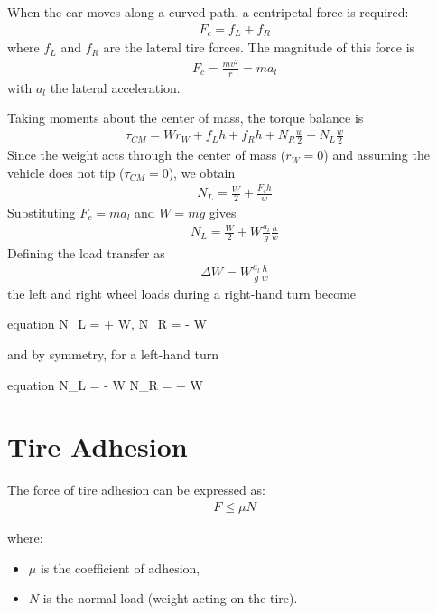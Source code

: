 \documentclass{article}
\begin{document}
	When the car moves along a curved path, a centripetal force is required:
	\begin{align}
		F_c=f_L+f_R
		\label{eq:centrifugal}
	\end{align}
	where $f_L$ and $f_R$ are the lateral tire forces. The magnitude of this force is
	\begin{align}
		F_c = \frac{mv^2}{r} = ma_l
	\end{align}
	with $a_l$ the lateral acceleration.
	
	Taking moments about the center of mass, the torque balance is
	\begin{align}
		\tau_{CM}=Wr_W+f_Lh+f_Rh+N_R\frac{w}{2}-N_L\frac{w}{2}
	\end{align}
	Since the weight acts through the center of mass ($r_W=0$) and assuming the vehicle does not tip ($\tau_{CM}=0$), we obtain
	\begin{align}
		N_L = \frac{W}{2} + \frac{F_c h}{w}
	\end{align}
	Substituting $F_c = ma_l$ and $W=mg$ gives
	\begin{align}
		N_L = \frac{W}{2} + W \frac{a_l}{g}\frac{h}{w}
	\end{align}
	Defining the load transfer as
	\begin{align}
		\Delta W = W \frac{a_l}{g}\frac{h}{w}
	\end{align}
	the left and right wheel loads during a right-hand turn become
	\begin{empheq}[box=\fbox]{equation}
		N_L =  + \Delta W, \quad 
		N_R =  - \Delta W
	\end{empheq}
	and by symmetry, for a left-hand turn
	\begin{empheq}[box=\fbox]{equation}
		N_L =  - \Delta W \quad
		N_R =  + \Delta W
	\end{empheq}
	
	\section{Tire Adhesion}  
	
	The force of tire adhesion can be expressed as:  
	\begin{align}  
		F \leq \mu N  
	\end{align}  
	
	where:  
	\begin{itemize}  
		\item $\mu$ is the coefficient of adhesion,  
		\item $N$ is the normal load (weight acting on the tire).  
	\end{itemize}  
	
\end{document}
